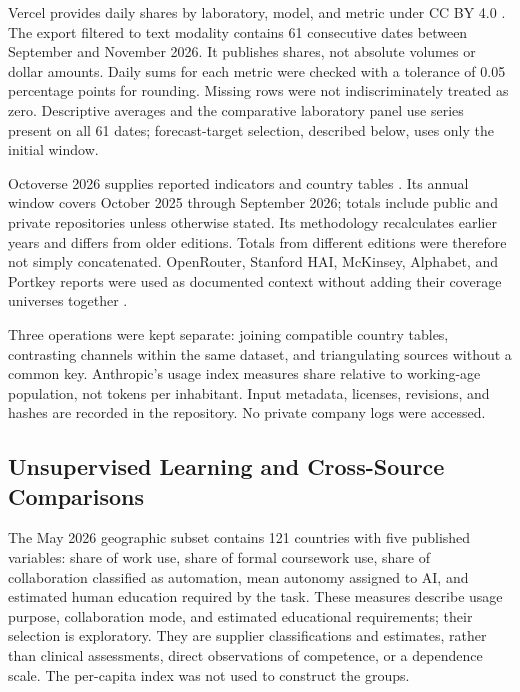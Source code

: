 \documentclass[11pt,a4paper]{article}
\begin{document}
Vercel provides daily shares by laboratory, model, and metric under CC BY 4.0 \cite{vercelexport}. The export filtered to text modality contains 61 consecutive dates between September and November 2026. It publishes shares, not absolute volumes or dollar amounts. Daily sums for each metric were checked with a tolerance of 0.05 percentage points for rounding. Missing rows were not indiscriminately treated as zero. Descriptive averages and the comparative laboratory panel use series present on all 61 dates; forecast-target selection, described below, uses only the initial window.

Octoverse 2026 supplies reported indicators and country tables \cite{github2026}. Its annual window covers October 2025 through September 2026; totals include public and private repositories unless otherwise stated. Its methodology recalculates earlier years and differs from older editions. Totals from different editions were therefore not simply concatenated. OpenRouter, Stanford HAI, McKinsey, Alphabet, and Portkey reports were used as documented context without adding their coverage universes together \cite{openrouter2026,stanford2025,stanford2026,mckinsey2026,google2025,google2026,portkey2026}.

Three operations were kept separate: joining compatible country tables, contrasting channels within the same dataset, and triangulating sources without a common key. Anthropic's usage index measures share relative to working-age population, not tokens per inhabitant. Input metadata, licenses, revisions, and hashes are recorded in the repository. No private company logs were accessed.

\subsection{Unsupervised Learning and Cross-Source Comparisons}
The May 2026 geographic subset contains 121 countries with five published variables: share of work use, share of formal coursework use, share of collaboration classified as automation, mean autonomy assigned to AI, and estimated human education required by the task. These measures describe usage purpose, collaboration mode, and estimated educational requirements; their selection is exploratory. They are supplier classifications and estimates, rather than clinical assessments, direct observations of competence, or a dependence scale. The per-capita index was not used to construct the groups.
\end{document}
